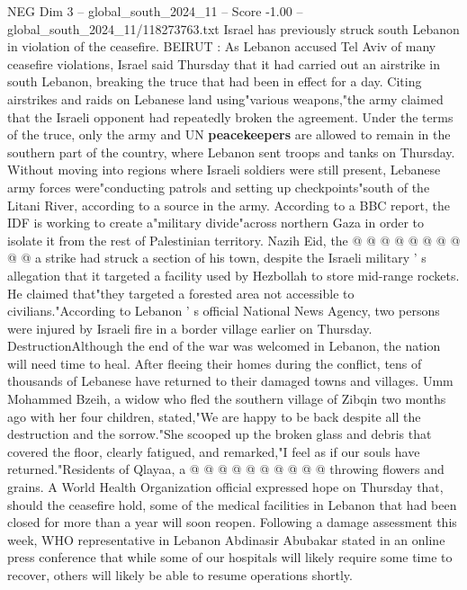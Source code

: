 \begin{textsample}{NEG Dim 3 – global\_south\_2024\_11 – Score -1.00 – global\_south\_2024\_11/118273763.txt}  \label{ex:f3_neg_155}
Israel has previously struck south Lebanon in violation of the ceasefire.
BEIRUT : As Lebanon accused Tel Aviv of many ceasefire violations, Israel said Thursday that it had carried out an airstrike in south Lebanon, breaking the truce that had been in effect for a day.
Citing airstrikes and raids on Lebanese land using"various weapons,"the army claimed that the Israeli opponent had repeatedly broken the agreement.
Under the terms of the truce, only the army and UN \textbf{peacekeepers} are allowed to remain in the southern part of the country, where Lebanon sent troops and tanks on Thursday.
Without moving into regions where Israeli soldiers were still present, Lebanese army forces were"conducting patrols and setting up checkpoints"south of the Litani River, according to a source in the army.
According to a BBC report, the IDF is working to create a"military divide"across northern Gaza in order to isolate it from the rest of Palestinian territory.
Nazih Eid, the @ @ @ @ @ @ @ @ @ @ a strike had struck a section of his town, despite the Israeli military ' s allegation that it targeted a facility used by Hezbollah to store mid-range rockets.
He claimed that"they targeted a forested area not accessible to civilians."According to Lebanon ' s official National News Agency, two persons were injured by Israeli fire in a border village earlier on Thursday.
DestructionAlthough the end of the war was welcomed in Lebanon, the nation will need time to heal.
After fleeing their homes during the conflict, tens of thousands of Lebanese have returned to their damaged towns and villages.
Umm Mohammed Bzeih, a widow who fled the southern village of Zibqin two months ago with her four children, stated,"We are happy to be back despite all the destruction and the sorrow."She scooped up the broken glass and debris that covered the floor, clearly fatigued, and remarked,"I feel as if our souls have returned."Residents of Qlayaa, a @ @ @ @ @ @ @ @ @ @ throwing flowers and grains.
A World Health Organization official expressed hope on Thursday that, should the ceasefire hold, some of the medical facilities in Lebanon that had been closed for more than a year will soon reopen.
Following a damage assessment this week, WHO representative in Lebanon Abdinasir Abubakar stated in an online press conference that while some of our hospitals will likely require some time to recover, others will likely be able to resume operations shortly.

\end{textsample}
